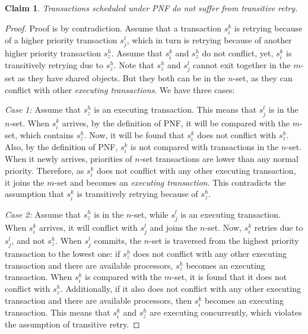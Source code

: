\documentclass[a4paper,english]{article}
\newtheorem{clm}{Claim}
\newtheorem{proof}{Proof}
\begin{document}
\begin{clm}\label{PNF-transitive-retry}
Transactions scheduled under PNF do not suffer from transitive
retry.
\end{clm}
\begin{proof}\normalfont
Proof is by contradiction. Assume that a transaction $s_{i}^{k}$
is retrying because of a higher priority transaction $s_{j}^{l}$, which
in turn is retrying because of another higher priority transaction
$s_{z}^{h}$. Assume that $s_{i}^{k}$ and $s_{z}^{h}$ do not conflict, yet,
$s_{i}^{k}$ is transitively retrying due to $s_{z}^{h}$. 
Note that $s_{z}^{h}$ and $s_{j}^{l}$ cannot exit together in
the $m$-set as they have shared objects. But they both can
be in the $n$-set, as they can conflict with other \emph{executing
transactions}. We have three cases:

\textit{Case 1:} Assume that $s_{z}^{h}$ is an executing transaction. This means that $s_{j}^{l}$ is in the $n$-set. When $s_{i}^{k}$ arrives, by the definition of PNF, it will be compared with the $m$-set, which contains $s_{z}^{h}$. Now, it will be found that $s_{i}^{k}$ does not conflict with $s_{z}^{h}$. Also, by the definition of PNF, $s_{i}^{k}$ is not compared with transactions in the $n$-set. When it newly arrives, priorities of $n$-set transactions are lower than any normal priority. Therefore, as $s_{i}^{k}$ does not conflict with any other executing
transaction, it joins the $m$-set and becomes an \emph{executing
transaction}. This contradicts the assumption that $s_{i}^{k}$
is transitively retrying because of $s_{z}^{h}$.



\textit{Case 2:} Assume that $s_{z}^{h}$ is in the $n$-set, while $s_{j}^{l}$
is an executing transaction. When $s_{i}^{k}$ arrives, it will conflict
with $s_{j}^{l}$ and joins the $n$-set. Now, $s_{i}^{k}$
retries due to $s_{j}^{l}$, and not $s_{z}^{h}$. When $s_{j}^{l}$ commits,
the $n$-set is traversed from the highest priority transaction
to the lowest one: if $s_{z}^{h}$ does not conflict with any other
executing transaction and there are available processors, $s_{z}^{h}$
becomes an executing transaction. When $s_{i}^{k}$ is compared with 
the $m$-set, it is found that it does not conflict with $s_{z}^{h}$. Additionally, if it also does not conflict with any other executing transaction and there are available processors, then $s_{i}^{k}$ becomes an executing
transaction. This means that $s_{i}^{k}$ and $s_{z}^{h}$ are executing
concurrently, which violates the assumption of transitive retry.


\end{proof}
\end{document}
